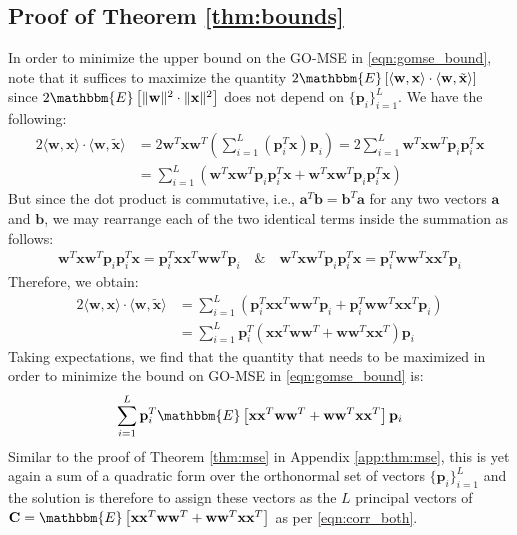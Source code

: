 \documentclass{article}
\theoremstyle{plain}
\begin{document}
\subsection{Proof of Theorem \ref{thm:bounds}}
\label{app:thm:bounds}
In order to minimize the upper bound on the GO-MSE in \eqref{eqn:gomse_bound}, note that it suffices to maximize the quantity $2\mathbbm{E}\left[ \langle\mathbf{w},\mathbf{x}\rangle \cdot\langle\mathbf{w},\tilde{\mathbf{x}}\rangle \right]$ since $2\mathbbm{E}\left[\lVert \mathbf{w} \rVert^2 \cdot \lVert \mathbf{x} \rVert^2 \right]$ does not depend on $\{\mathbf{p}_i\}_{i=1}^L$. We have the following:
\begin{align*}
    2 \langle\mathbf{w},\mathbf{x}\rangle \cdot\langle\mathbf{w},\tilde{\mathbf{x}}\rangle  &=2\mathbf{w}^T\mathbf{x}\mathbf{w}^T\left(\sum_{i=1}^L\left(\mathbf{p}_i^T\mathbf{x}\right)\mathbf{p}_i\right)= 2\sum_{i=1}^L\mathbf{w}^T\mathbf{x}\mathbf{w}^T\mathbf{p}_i\mathbf{p}_i^T\mathbf{x} \\
    ~&= \sum_{i=1}^L\left(\mathbf{w}^T\mathbf{x}\mathbf{w}^T\mathbf{p}_i\mathbf{p}_i^T\mathbf{x} + \mathbf{w}^T\mathbf{x}\mathbf{w}^T\mathbf{p}_i\mathbf{p}_i^T\mathbf{x} \right)
\end{align*}
But since the dot product is commutative, i.e., $\mathbf{a}^T\mathbf{b} = \mathbf{b}^T\mathbf{a}$ for any two vectors $\mathbf{a}$ and $\mathbf{b}$, we may rearrange each of the two identical terms inside the summation as follows:
\begin{align*}
    \mathbf{w}^T\mathbf{x}\mathbf{w}^T\mathbf{p}_i\mathbf{p}_i^T\mathbf{x} = \mathbf{p}_i^T\mathbf{x}\mathbf{x}^T\mathbf{w}\mathbf{w}^T\mathbf{p}_i \quad \& \quad \mathbf{w}^T\mathbf{x}\mathbf{w}^T\mathbf{p}_i\mathbf{p}_i^T\mathbf{x} = \mathbf{p}_i^T\mathbf{w}\mathbf{w}^T\mathbf{x}\mathbf{x}^T\mathbf{p}_i
\end{align*}
Therefore, we obtain:
\begin{align*}
2 \langle\mathbf{w},\mathbf{x}\rangle \cdot\langle\mathbf{w},\tilde{\mathbf{x}}\rangle &=\sum_{i=1}^L\left(\mathbf{p}_i^T\mathbf{x}\mathbf{x}^T\mathbf{w}\mathbf{w}^T\mathbf{p}_i+ \mathbf{p}_i^T\mathbf{w}\mathbf{w}^T\mathbf{x}\mathbf{x}^T\mathbf{p}_i\right) \\
&=\sum_{i=1}^L\mathbf{p}_i^T\left(\mathbf{x}\mathbf{x}^T\mathbf{w}\mathbf{w}^T+\mathbf{w}\mathbf{w}^T\mathbf{x}\mathbf{x}^T\right)\mathbf{p}_i
\end{align*}
Taking expectations, we find that the quantity that needs to be maximized in order to minimize the bound on GO-MSE in \eqref{eqn:gomse_bound} is:
\begin{align*}
\sum_{i=1}^L\mathbf{p}_i^T\mathbbm{E}\left[\mathbf{x}\mathbf{x}^T\mathbf{w}\mathbf{w}^T+\mathbf{w}\mathbf{w}^T\mathbf{x}\mathbf{x}^T\right]\mathbf{p}_i
\end{align*}
Similar to the proof of Theorem \ref{thm:mse} in Appendix \ref{app:thm:mse}, this is yet again a sum of a quadratic form over the orthonormal set of vectors $\{\mathbf{p}_i\}_{i=1}^L$ and the solution is therefore to assign these vectors as the $L$ principal vectors of $\mathbf{C}=\mathbbm{E}\left[\mathbf{x}\mathbf{x}^T\mathbf{w}\mathbf{w}^T+\mathbf{w}\mathbf{w}^T\mathbf{x}\mathbf{x}^T\right]$ as per \eqref{eqn:corr_both}.
\end{document}
